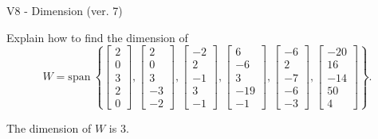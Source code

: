 \begin{exercise}
  \begin{exerciseTitle}V8 - Dimension (ver. 7)\end{exerciseTitle}
  \begin{exerciseStatement}
    Explain how to find the dimension of 
\[W=\mathrm{span}\ \left\{\left[\begin{array}{r}
2 \\
0 \\
3 \\
2 \\
0
\end{array}\right] , \left[\begin{array}{r}
2 \\
0 \\
3 \\
-3 \\
-2
\end{array}\right] , \left[\begin{array}{r}
-2 \\
2 \\
-1 \\
3 \\
-1
\end{array}\right] , \left[\begin{array}{r}
6 \\
-6 \\
3 \\
-19 \\
-1
\end{array}\right] , \left[\begin{array}{r}
-6 \\
2 \\
-7 \\
-6 \\
-3
\end{array}\right] , \left[\begin{array}{r}
-20 \\
16 \\
-14 \\
50 \\
4
\end{array}\right]\right\}.\]



  \end{exerciseStatement}
  \begin{exerciseAnswer}
   The dimension of \(W\) is  \(3\).
  


  \end{exerciseAnswer}
\end{exercise}